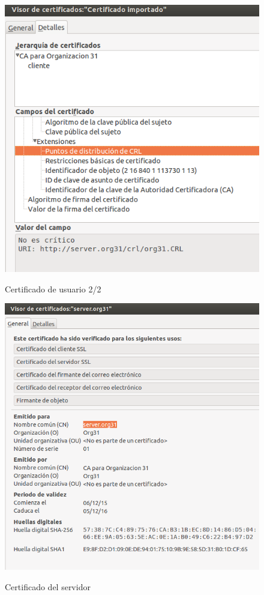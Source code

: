 \documentclass[]{article}
\begin{document}
\begin{figure}[h]
	\caption{Certificado de usuario 2/2}
	\centering
	\includegraphics[scale=0.5]{images/certs/usercert2.png}
	\label{fig:usercert2}
\end{figure}

\begin{figure}[h]
	\caption{Certificado del servidor}
	\centering
	\includegraphics[scale=0.5]{images/certs/servercert1.png}
	\label{fig:servercert1}
\end{figure}
\end{document}
